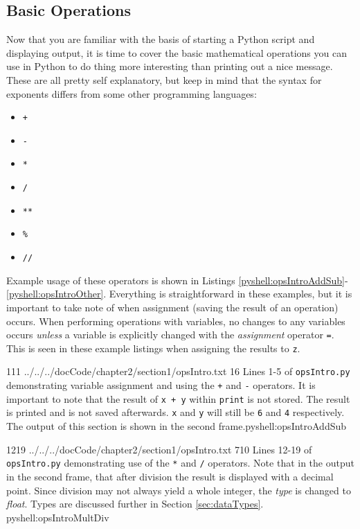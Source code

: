 \documentclass[oneside]{book}
\begin{document}
\subsection{Basic Operations}
\label{sec:ops}
Now that you are familiar with the basis of starting a Python script and displaying output, it is time to cover the basic mathematical operations you can use in Python to do thing more interesting than printing out a nice message. These are all pretty self explanatory, but keep in mind that the syntax for exponents differs from some other programming languages:
\begin{itemize}
\item{ \texttt{+}}
\item{ \texttt{-}}
\item{ \texttt{*}}
\item{ \texttt{/}}
\item{ \texttt{**}}
\item{ \texttt{\%}}
\item{ \texttt{//}}
\end{itemize}

Example usage of these operators is shown in Listings \ref{pyshell:opsIntroAddSub}-\ref{pyshell:opsIntroOther}. Everything is straightforward in these examples, but it is important to take note of when assignment (saving the result of an operation) occurs. When performing operations with variables, no changes to any variables occurs \textit{unless} a variable is explicitly changed with the \textit{assignment} operator \texttt{=}. This is seen in these example listings when assigning the results to \texttt{z}.

{1}{11}
{../../../docCode/chapter2/section1/opsIntro.txt}
{1}{6}
{Lines 1-5 of \texttt{opsIntro.py} demonstrating variable assignment and using the \texttt{+} and \texttt{-} operators. It is important to note that the result of \texttt{x + y} within \texttt{print} is not stored. The result is printed and is not saved afterwards. \texttt{x} and \texttt{y} will still be \texttt{6} and \texttt{4} respectively. The output of this section is shown in the second frame.}{pyshell:opsIntroAddSub}

{12}{19}
{../../../docCode/chapter2/section1/opsIntro.txt}
{7}{10}
{Lines 12-19 of \texttt{opsIntro.py} demonstrating use of the \texttt{*} and \texttt{/} operators. Note that in the output in the second frame, that after division the result is displayed with a decimal point. Since division may not always yield a whole integer, the \textit{type} is changed to \textit{float}. Types are discussed further in Section \ref{sec:dataTypes}.}
{pyshell:opsIntroMultDiv}
\end{document}
